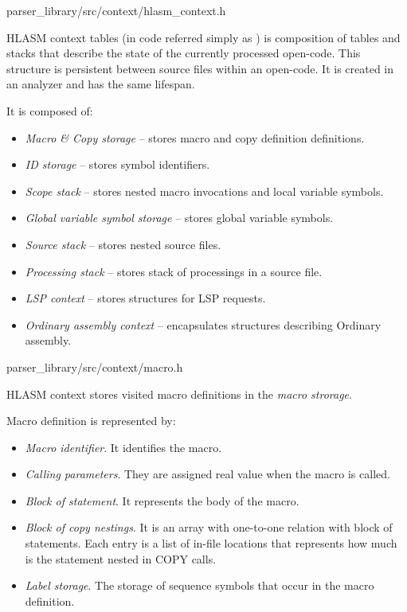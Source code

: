 {parser\_library/src/context/hlasm\_context.h}

HLASM context tables (in code referred simply as ) is composition of tables and stacks that describe the state of the currently processed open-code. This structure is persistent between source files within an open-code. It is created in an analyzer and has the same lifespan. 

It is composed of:

\begin{itemize}
	\item \emph{Macro \& Copy storage} -- stores macro and copy definition definitions.
	\item \emph{ID storage} -- stores symbol identifiers.
	\item \emph{Scope stack} -- stores nested macro invocations and local variable symbols.
	\item \emph{Global variable symbol storage} -- stores global variable symbols.
	\item \emph{Source stack} -- stores nested source files.
	\item \emph{Processing stack} -- stores stack of processings in a source file.
	\item \emph{LSP context} -- stores structures for LSP requests.
	\item \emph{Ordinary assembly context} -- encapsulates structures describing Ordinary assembly.
\end{itemize}

{parser\_library/src/context/macro.h}

HLASM context stores visited macro definitions in the \emph{macro strorage}. 

Macro definition is represented by:
\begin{itemize}
	\item \emph{Macro identifier}. It identifies the macro.
	\item \emph{Calling parameters}. They are assigned real value when the macro is called.
	\item \emph{Block of statement}. It represents the body of the macro.
	\item \emph{Block of copy nestings}. It is an array with one-to-one relation with block of statements. Each entry is a list of in-file locations that represents how much is the statement nested in COPY calls.
	\item \emph{Label storage}. The storage of sequence symbols that occur in the macro definition.
\end{itemize}

